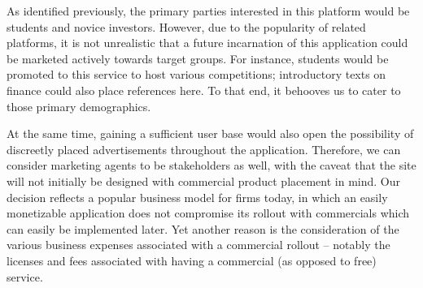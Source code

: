 As identified previously, the primary parties interested in
this platform would be students and novice investors. However,
due to the popularity of related platforms, it is not
unrealistic that a future incarnation of this application 
could be marketed actively towards target groups. For instance,
students would be promoted to this service to host various
competitions; introductory texts on finance could also place
references here. To that end, it behooves us to cater to those
primary demographics.

At the same time, gaining a sufficient user base would also
open the possibility of discreetly placed advertisements 
throughout the application. Therefore, we can consider 
marketing agents to be stakeholders as well, with the caveat
that the site will not initially be designed with commercial
product placement in mind. Our decision reflects a popular 
business model for firms today, in which an easily monetizable
application does not compromise its rollout with commercials
which can easily be implemented later. Yet another reason is 
the consideration of the various business expenses associated 
with a commercial rollout -- notably the licenses and fees
associated with having a commercial (as opposed to free)
service.